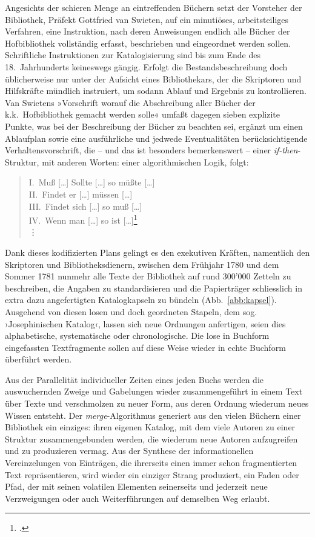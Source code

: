\documentclass[a4paper,10pt]{article}
\newcommand{\anf}[1]{»#1«}
\newcommand{\inanf}[1]{›#1‹}
\begin{document}
Angesichts der schieren Menge an eintreffenden Büchern setzt der Vorsteher der Bibliothek, Präfekt Gottfried van Swieten, auf ein minutiöses, arbeitsteiliges Verfahren, eine Instruktion, nach deren Anweisungen endlich alle Bücher der Hofbibliothek vollständig erfasst, beschrieben und eingeordnet werden sollen. Schriftliche Instruktionen zur Katalogisierung sind bis zum Ende des 18.~Jahrhunderts keineswegs gängig. Erfolgt die Bestandsbeschreibung doch üblicherweise nur unter der Aufsicht eines Bibliothekars, der die Skriptoren und Hilfskräfte mündlich instruiert, um sodann Ablauf und Ergebnis zu kontrollieren. Van Swietens \anf{Vorschrift worauf die Abschreibung aller Bücher der k.k.~Hofbibliothek gemacht werden solle} umfaßt dagegen sieben explizite Punkte, was bei der Beschreibung der Bücher zu beachten sei, ergänzt um einen Ablaufplan sowie eine ausführliche und jedwede Eventualitäten berücksichtigende Verhaltensvorschrift, die – und das ist besonders bemerkenswert – einer \emph{if-then}-Struktur, mit anderen Worten: einer algorithmischen Logik, folgt:
\begin{verse}
I.~Muß [\ldots] Sollte [\ldots] so müßte [\ldots]\\
II.~Findet er [\ldots] müssen [\ldots]\\
III.~Findet sich [\ldots] so muß [\ldots]\\ 
IV.~Wenn man [\ldots] so ist [\ldots]\footcite[125 f.]{bartsch:1780}\\
\qquad\vdots\\ 
\end{verse}
Dank dieses kodifizierten Plans gelingt es den exekutiven Kräften, namentlich den Skriptoren und Bibliotheksdienern, zwischen dem Frühjahr 1780 und dem Sommer 1781 nunmehr alle Texte der Bibliothek auf rund 300'000 Zetteln zu beschreiben, die Angaben zu standardisieren und die Papierträger schliesslich in extra dazu angefertigten Katalogkapseln zu bündeln (Abb.~\ref{abb:kapsel}). Ausgehend von diesen losen und doch geordneten Stapeln, dem sog. \inanf{Josephinischen Katalog}, lassen sich neue Ordnungen anfertigen, seien dies alphabetische, systematische oder chronologische. Die lose in Buchform eingefassten Textfragmente sollen auf diese Weise wieder in echte Buchform überführt werden.

Aus der Parallelität individueller Zeiten eines jeden Buchs werden die auswuchernden Zweige und Gabelungen wieder zusammengeführt in einem Text über Texte und verschmolzen zu neuer Form, aus deren Ordnung wiederum neues Wissen entsteht. Der  \emph{merge}-Algorithmus generiert aus den vielen Büchern einer Bibliothek ein einziges: ihren eigenen Katalog, mit dem viele Autoren zu einer Struktur zusammengebunden werden, die wiederum neue Autoren aufzugreifen und zu produzieren vermag. Aus der Synthese der informationellen Vereinzelungen von Einträgen, die ihrerseits einen immer schon fragmentierten Text repräsentieren, wird wieder ein einziger Strang produziert, ein Faden oder Pfad, der mit seinen volatilen Elementen seinerseits und jederzeit neue Verzweigungen oder auch Weiterführungen auf demselben Weg erlaubt.
\end{document}

